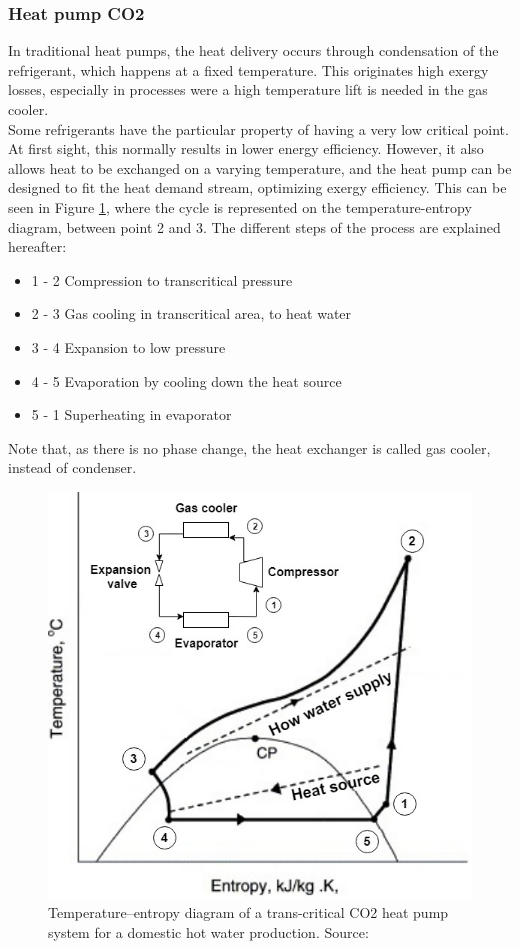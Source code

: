 \documentclass{article}
\begin{document}
\subsubsection{Heat pump CO2}
In traditional heat pumps, the heat delivery occurs through condensation of the refrigerant, which happens at a fixed temperature. This originates high exergy losses, especially in processes were a high temperature lift is needed in the gas cooler.\\
Some refrigerants have the particular property of having a very low critical point. At first sight, this normally results in lower energy efficiency. However, it also allows heat to be exchanged on a varying temperature, and the heat pump can be designed to fit the heat demand stream, optimizing exergy efficiency. This can be seen in Figure \ref{fig:hp_CO2}, where the cycle is represented on the temperature-entropy diagram, between point 2 and 3. The different steps of the process are explained hereafter: 
\begin{itemize}
\item 1 - 2 Compression to transcritical pressure
\item 2 - 3 Gas cooling in transcritical area, to heat water
\item 3 - 4 Expansion to low pressure
\item 4 - 5 Evaporation by cooling down the heat source
\item 5 - 1 Superheating in evaporator
\end{itemize}
Note that, as there is no phase change, the heat exchanger is called gas cooler, instead of condenser.\\
\begin{figure}[h!]
\centering
\includegraphics[width=1\textwidth]{HP_cylce_CO2_schema.png}
\caption{Temperature–entropy diagram of a trans-critical CO2 heat pump system for a domestic hot water production. Source: \cite{kimPerformanceTranscriticalCO22005}}
\label{fig:hp_CO2}
\end{figure}
\end{document}
